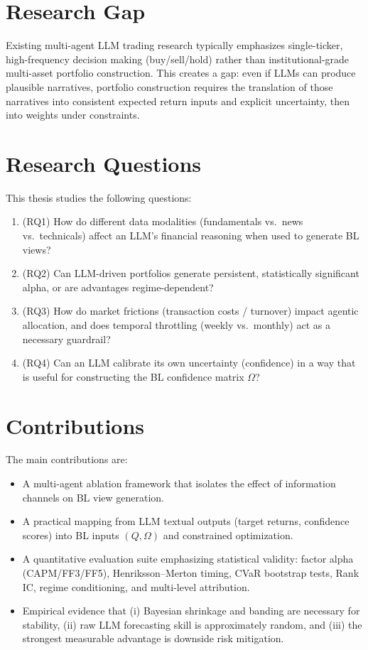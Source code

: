 \documentclass[12pt]{report}
\begin{document}
\section{Research Gap}
Existing multi-agent LLM trading research typically emphasizes single-ticker, high-frequency decision making (buy/sell/hold) rather than institutional-grade multi-asset portfolio construction.
This creates a gap: even if LLMs can produce plausible narratives, portfolio construction requires the translation of those narratives into consistent expected return inputs and explicit uncertainty, then into weights under constraints.

\section{Research Questions}
This thesis studies the following questions:
\begin{enumerate}
    \item (RQ1) How do different data modalities (fundamentals vs.~news vs.~technicals) affect an LLM's financial reasoning when used to generate BL views?
    \item (RQ2) Can LLM-driven portfolios generate persistent, statistically significant alpha, or are advantages regime-dependent?
    \item (RQ3) How do market frictions (transaction costs / turnover) impact agentic allocation, and does temporal throttling (weekly vs.~monthly) act as a necessary guardrail?
    \item (RQ4) Can an LLM calibrate its own uncertainty (confidence) in a way that is useful for constructing the BL confidence matrix $\Omega$?
\end{enumerate}

\section{Contributions}
The main contributions are:
\begin{itemize}
    \item A multi-agent ablation framework that isolates the effect of information channels on BL view generation.
    \item A practical mapping from LLM textual outputs (target returns, confidence scores) into BL inputs $(Q,\Omega)$ and constrained optimization.
    \item A quantitative evaluation suite emphasizing statistical validity: factor alpha (CAPM/FF3/FF5), Henriksson--Merton timing, CVaR bootstrap tests, Rank IC, regime conditioning, and multi-level attribution.
    \item Empirical evidence that (i) Bayesian shrinkage and banding are necessary for stability, (ii) raw LLM forecasting skill is approximately random, and (iii) the strongest measurable advantage is downside risk mitigation.
\end{itemize}
\end{document}
